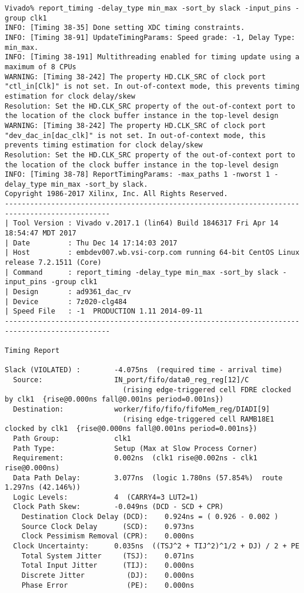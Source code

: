 \documentclass{article}
\begin{document}
\begin{lstlisting}
Vivado% report_timing -delay_type min_max -sort_by slack -input_pins -group clk1
INFO: [Timing 38-35] Done setting XDC timing constraints.
INFO: [Timing 38-91] UpdateTimingParams: Speed grade: -1, Delay Type: min_max.
INFO: [Timing 38-191] Multithreading enabled for timing update using a maximum of 8 CPUs
WARNING: [Timing 38-242] The property HD.CLK_SRC of clock port "ctl_in[Clk]" is not set. In out-of-context mode, this prevents timing estimation for clock delay/skew
Resolution: Set the HD.CLK_SRC property of the out-of-context port to the location of the clock buffer instance in the top-level design
WARNING: [Timing 38-242] The property HD.CLK_SRC of clock port "dev_dac_in[dac_clk]" is not set. In out-of-context mode, this prevents timing estimation for clock delay/skew
Resolution: Set the HD.CLK_SRC property of the out-of-context port to the location of the clock buffer instance in the top-level design
INFO: [Timing 38-78] ReportTimingParams: -max_paths 1 -nworst 1 -delay_type min_max -sort_by slack.
Copyright 1986-2017 Xilinx, Inc. All Rights Reserved.
-----------------------------------------------------------------------------------------------
| Tool Version : Vivado v.2017.1 (lin64) Build 1846317 Fri Apr 14 18:54:47 MDT 2017
| Date         : Thu Dec 14 17:14:03 2017
| Host         : embdev007.wb.vsi-corp.com running 64-bit CentOS Linux release 7.2.1511 (Core)
| Command      : report_timing -delay_type min_max -sort_by slack -input_pins -group clk1
| Design       : ad9361_dac_rv
| Device       : 7z020-clg484
| Speed File   : -1  PRODUCTION 1.11 2014-09-11
-----------------------------------------------------------------------------------------------

Timing Report

Slack (VIOLATED) :        -4.075ns  (required time - arrival time)
  Source:                 IN_port/fifo/data0_reg_reg[12]/C
                            (rising edge-triggered cell FDRE clocked by clk1  {rise@0.000ns fall@0.001ns period=0.001ns})
  Destination:            worker/fifo/fifo/fifoMem_reg/DIADI[9]
                            (rising edge-triggered cell RAMB18E1 clocked by clk1  {rise@0.000ns fall@0.001ns period=0.001ns})
  Path Group:             clk1
  Path Type:              Setup (Max at Slow Process Corner)
  Requirement:            0.002ns  (clk1 rise@0.002ns - clk1 rise@0.000ns)
  Data Path Delay:        3.077ns  (logic 1.780ns (57.854%)  route 1.297ns (42.146%))
  Logic Levels:           4  (CARRY4=3 LUT2=1)
  Clock Path Skew:        -0.049ns (DCD - SCD + CPR)
    Destination Clock Delay (DCD):    0.924ns = ( 0.926 - 0.002 ) 
    Source Clock Delay      (SCD):    0.973ns
    Clock Pessimism Removal (CPR):    0.000ns
  Clock Uncertainty:      0.035ns  ((TSJ^2 + TIJ^2)^1/2 + DJ) / 2 + PE
    Total System Jitter     (TSJ):    0.071ns
    Total Input Jitter      (TIJ):    0.000ns
    Discrete Jitter          (DJ):    0.000ns
    Phase Error              (PE):    0.000ns


\end{lstlisting}
\end{document}
